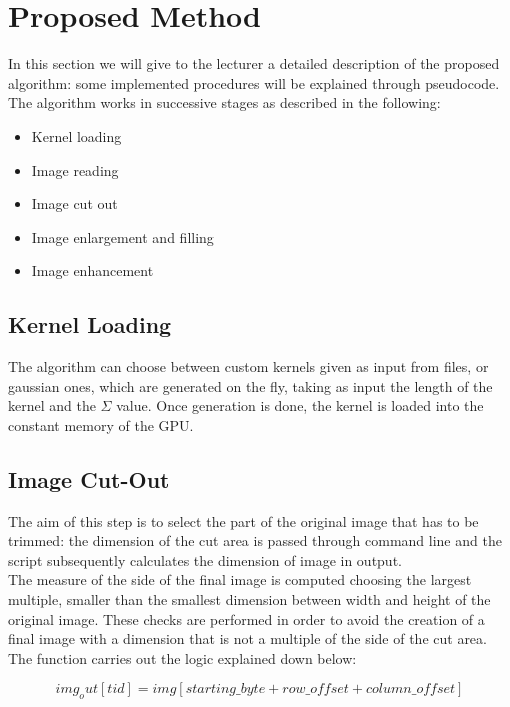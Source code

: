 \section{Proposed Method}

In this section we will give to the lecturer a detailed description of the proposed algorithm: 
some implemented procedures will be explained through pseudocode. 
The algorithm works in successive stages as described in the following:

\begin{itemize}
    \item Kernel loading
    \item Image reading
    \item Image cut out
    \item Image enlargement and filling
    \item Image enhancement
\end{itemize}

    \subsection{Kernel Loading}
    The algorithm can choose between custom kernels given as input from files, or gaussian ones, which are generated on the fly,
    taking as input the length of the kernel and the $\Sigma$ value. Once generation is done, the kernel is loaded into 
    the constant memory of the GPU.\\ %

    \subsection{Image Cut-Out}
    The aim of this step is to select the part of the original image that has to be trimmed: 
    the dimension of the cut area is passed through command line and the script subsequently calculates the dimension of image in output.  \\ 
    The measure of the side of the final image is computed choosing the largest multiple, 
    smaller than the smallest dimension between width and height of the original image. These checks are performed in order to avoid the creation of a final 
    image with a dimension that is not a multiple of the side of the cut area.\\
    The function carries out the logic explained down below:

    \begin{equation}
        img_out[tid] = img[starting\_byte + row\_offset + column\_offset]
    \end{equation}
    
